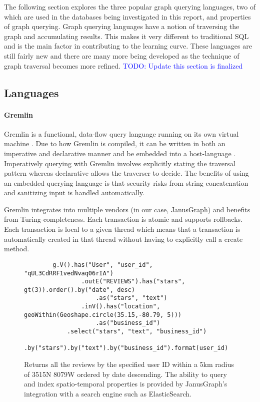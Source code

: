 The following section explores the three popular graph querying languages, two of which are used in the databases being investigated in this report, and properties of graph querying. Graph querying languages have a notion of traversing the graph and accumulating results. This makes it very different to traditional SQL and is the main factor in contributing to the learning curve. These languages are still fairly new and there are many more being developed as the technique of graph traversal becomes more refined. \textcolor{blue}{TODO: Update this section is finalized}

\subsection{Languages}

\paragraph{Gremlin}

Gremlin is a functional, data-flow query language running on its own virtual machine \cite{gremlin-tinkerpop}. Due to how Gremlin is compiled, it can be written in both an imperative and declarative manner and be embedded into a host-language \cite{tinkerpop-docs}. Imperatively querying with Gremlin involves explicitly stating the traversal pattern whereas declarative allows the traverser to decide. The benefits of using an embedded querying language is that security risks from string concatenation and sanitizing input is handled automatically.

Gremlin integrates into multiple vendors (in our case, JanusGraph) and benefits from Turing-completeness. Each transaction is atomic and supports rollbacks. Each transaction is local to a given thread which means that a transaction is automatically created in that thread without having to explicitly call a create method.

\begin{figure}
    \centering
    \begin{verbatim}
        g.V().has("User", "user_id", "qUL3CdRRF1vedNvaq06rIA")
                .outE("REVIEWS").has("stars", gt(3)).order().by("date", desc)
                    .as("stars", "text")
                .inV().has("location", geoWithin(Geoshape.circle(35.15,-80.79, 5)))
                    .as("business_id")
            .select("stars", "text", "business_id")
            .by("stars").by("text").by("business_id").format(user_id)
    \end{verbatim}
    \caption{Returns all the reviews by the specified user ID within a 5km radius of 35\degree 15N 80\degree 79W ordered by date descending. The ability to query and index spatio-temporal properties is provided by JanusGraph's integration with a search engine such as ElasticSearch.}
    \label{lst:gremlin-example-1}
\end{figure}

